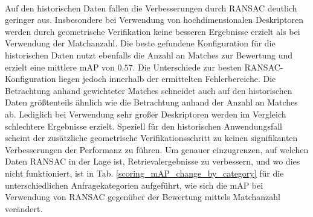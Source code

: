 \\
Auf den historischen Daten fallen die Verbesserungen durch RANSAC deutlich geringer aus. Insbesondere bei Verwendung von hochdimensionalen Deskriptoren werden durch geometrische Verifikation keine besseren Ergebnisse erzielt als bei Verwendung der Matchanzahl. Die beste gefundene Konfiguration für die historischen Daten nutzt ebenfalls die Anzahl an Matches zur Bewertung und erzielt eine mittlere mAP von $0.57$. Die Unterschiede zur besten RANSAC-Konfiguration liegen jedoch innerhalb der ermittelten Fehlerbereiche. Die Betrachtung anhand gewichteter Matches schneidet auch auf den historischen Daten größtenteils ähnlich wie die Betrachtung anhand der Anzahl an Matches ab. Lediglich bei Verwendung sehr großer Deskriptoren werden im Vergleich schlechtere Ergebnisse erzielt. Speziell für den historischen Anwendungsfall scheint der zusätzliche geometrische Verifikationsschritt zu keinen signifikanten Verbesserungen der Performanz zu führen.
Um genauer einzugrenzen, auf welchen Daten RANSAC in der Lage ist, Retrievalergebnisse zu verbessern, und wo dies nicht funktioniert, ist in Tab. \ref{scoring_mAP_change_by_category} für die unterschiedlichen Anfragekategorien aufgeführt, wie sich die mAP bei Verwendung von RANSAC gegenüber der Bewertung mittels Matchanzahl verändert.
\\
